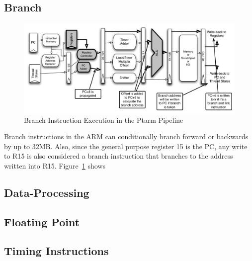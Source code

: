 \subsection{Branch}
\begin{figure}
  \vspace{-20pt}
  \begin{center}
    \includegraphics[scale=.6]{figs/branch_pipeline_implementation}
  \end{center}
  \vspace{-20pt}
  \caption{Branch Instruction Execution in the Ptarm Pipeline}
  \label{fig:branch_pipeline_implementation}
\end{figure}
Branch instructions in the ARM can conditionally branch forward or backwards by up to 32MB. 
Also, since the general purpose register 15 is the PC, any write to R15 is also considered a branch instruction that branches to the address written into R15.
Figure~\ref{fig:branch_pipeline_implementation} shows     
\subsection{Data-Processing}
\subsection{Floating Point}
\subsection{Timing Instructions}
